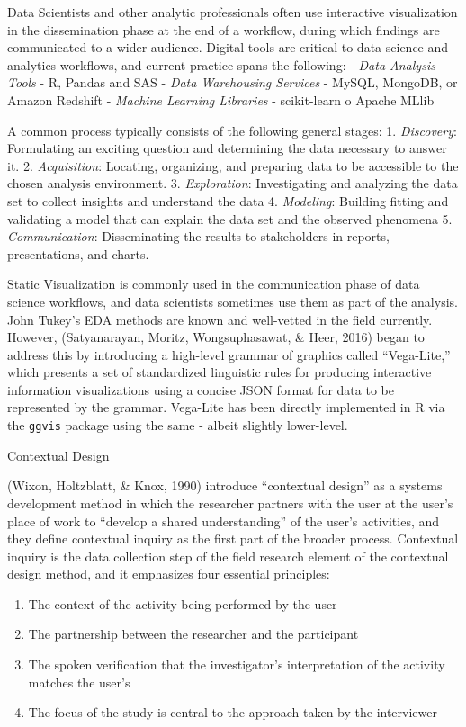 \documentclass[print]{nuthesis}
\providecommand{\tightlist}{%
  \setlength{\itemsep}{0pt}\setlength{\parskip}{0pt}}
\begin{document}
Data Scientists and other analytic professionals often use interactive visualization in the dissemination phase at the end of a workflow, during which findings are communicated to a wider audience. Digital tools are critical to data science and analytics workflows, and current practice spans the following:
- \emph{Data Analysis Tools} - R, Pandas and SAS
- \emph{Data Warehousing Services} - MySQL, MongoDB, or Amazon Redshift
- \emph{Machine Learning Libraries} - scikit-learn o Apache MLlib

A common process typically consists of the following general stages:
1. \emph{Discovery}: Formulating an exciting question and determining the data necessary to answer it.
2. \emph{Acquisition}: Locating, organizing, and preparing data to be accessible to the chosen analysis environment.
3. \emph{Exploration}: Investigating and analyzing the data set to collect insights and understand the data
4. \emph{Modeling}: Building fitting and validating a model that can explain the data set and the observed phenomena
5. \emph{Communication}: Disseminating the results to stakeholders in reports, presentations, and charts.

Static Visualization is commonly used in the communication phase of data science workflows, and data scientists sometimes use them as part of the analysis. John Tukey's EDA methods are known and well-vetted in the field currently. However, (Satyanarayan, Moritz, Wongsuphasawat, \& Heer, 2016) began to address this by introducing a high-level grammar of graphics called ``Vega-Lite,'' which presents a set of standardized linguistic rules for producing interactive information visualizations using a concise JSON format for data to be represented by the grammar. Vega-Lite has been directly implemented in R via the \texttt{ggvis} package using the same - albeit slightly lower-level.

Contextual Design

(Wixon, Holtzblatt, \& Knox, 1990) introduce ``contextual design'' as a systems development method in which the researcher partners with the user at the user's place of work to ``develop a shared understanding'' of the user's activities, and they define contextual inquiry as the first part of the broader process. Contextual inquiry is the data collection step of the field research element of the contextual design method, and it emphasizes four essential principles:

\begin{enumerate}
\def\labelenumi{\arabic{enumi}.}
\tightlist
\item
  The context of the activity being performed by the user
\item
  The partnership between the researcher and the participant
\item
  The spoken verification that the investigator's interpretation of the activity matches the user's
\item
  The focus of the study is central to the approach taken by the interviewer
\end{enumerate}
\end{document}
